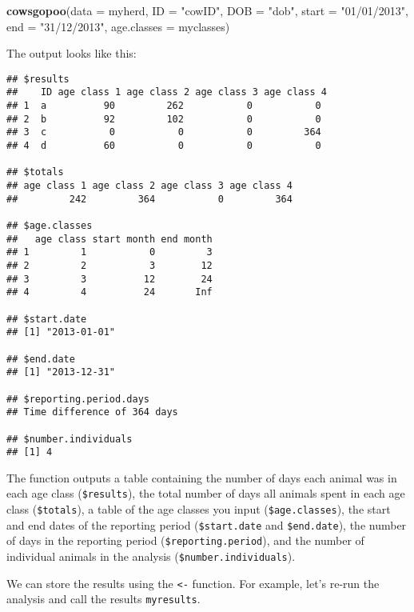 \documentclass[12pt]{article}
\newcommand{\KeywordTok}[1]{\textcolor[rgb]{0.13,0.29,0.53}{\textbf{{#1}}}}
\newcommand{\DataTypeTok}[1]{\textcolor[rgb]{0.13,0.29,0.53}{{#1}}}
\newcommand{\StringTok}[1]{\textcolor[rgb]{0.31,0.60,0.02}{{#1}}}
\newcommand{\NormalTok}[1]{{#1}}
\begin{document}
\begin{snugshade}
\begin{Highlighting}[]
\KeywordTok{cowsgopoo}\NormalTok{(}\DataTypeTok{data =} \NormalTok{myherd, }\DataTypeTok{ID =} \StringTok{"cowID"}\NormalTok{, }\DataTypeTok{DOB =} \StringTok{"dob"}\NormalTok{, }\DataTypeTok{start =} \StringTok{"01/01/2013"}\NormalTok{, }
          \DataTypeTok{end =} \StringTok{"31/12/2013"}\NormalTok{, }\DataTypeTok{age.classes =} \NormalTok{myclasses)}
\end{Highlighting}
\end{snugshade}

The output looks like this:

\begin{verbatim}
## $results
##    ID age class 1 age class 2 age class 3 age class 4
## 1  a          90         262           0           0
## 2  b          92         102           0           0
## 3  c           0           0           0         364
## 4  d          60           0           0           0

## $totals
## age class 1 age class 2 age class 3 age class 4 
##         242         364           0         364 

## $age.classes
##   age class start month end month
## 1         1           0         3
## 2         2           3        12
## 3         3          12        24
## 4         4          24       Inf

## $start.date
## [1] "2013-01-01"

## $end.date
## [1] "2013-12-31"

## $reporting.period.days
## Time difference of 364 days

## $number.individuals
## [1] 4
\end{verbatim}

The function outputs a table containing the number of days each animal was in each age class (\texttt{\$results}), the total number of days all animals spent in each age class (\texttt{\$totals}), a table of the age classes you input (\texttt{\$age.classes}), the start and end dates of the reporting period (\texttt{\$start.date} and \texttt{\$end.date}), the number of days in the reporting period (\texttt{\$reporting.period}), and the number of individual animals in the analysis (\texttt{\$number.individuals}).

We can store the results using the \texttt{<-} function. For example, let's re-run the analysis and call the results \texttt{myresults}.
\end{document}
